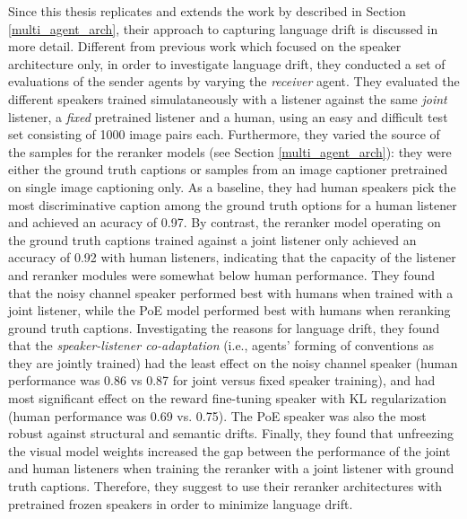 Since this thesis replicates and extends the work by \cite{lazaridou2020multi} described in Section \ref{multi_agent_arch}, their approach to capturing language drift is discussed in more detail.
Different from previous work which focused on the speaker architecture only, in order to investigate language drift, they conducted a set of evaluations of the sender agents by varying the \emph{receiver} agent. They evaluated the different speakers trained simulataneously with a listener against the same \textit{joint} listener, a \textit{fixed} pretrained listener and a human, using an easy and difficult test set consisting of 1000 image pairs each. Furthermore, they varied the source of the samples for the reranker models (see Section \ref{multi_agent_arch}): they were either the ground truth captions or samples from an image captioner pretrained on single image captioning only. As a baseline, they had human speakers pick the most discriminative caption among the ground truth options for a human listener and achieved an acuracy of 0.97. By contrast, the reranker model operating on the ground truth captions trained against a joint listener only achieved an accuracy of 0.92 with human listeners, indicating that the capacity of the listener and reranker modules were somewhat below human performance. They found that the noisy channel speaker performed best with humans when trained with a joint listener, while the PoE model performed best with humans when reranking ground truth captions. Investigating the reasons for language drift, they found that the \emph{speaker-listener co-adaptation} (i.e., agents' forming of conventions as they are jointly trained) had the least effect on the noisy channel speaker (human performance was 0.86 vs 0.87 for joint versus fixed speaker training), and had most significant effect on the reward fine-tuning speaker with KL regularization (human performance was 0.69 vs. 0.75). The PoE speaker was also the most robust against structural and semantic drifts. Finally, they found that unfreezing the visual model weights increased the gap between the performance of the joint and human listeners when training the reranker with a joint listener with ground truth captions. Therefore, they suggest to use their reranker architectures with pretrained frozen speakers in order to minimize language drift.

